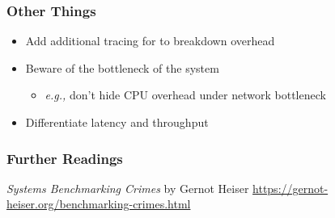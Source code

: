 \documentclass[xcolor={dvipsnames},aspectratio=149]{beamer}
\def\eg{\emph{e.g.,}\xspace}
\begin{document}
\begin{frame}
  \frametitle{Other Things}
  \begin{itemize}
  \item Add additional tracing for to breakdown overhead
  \item Beware of the bottleneck of the system
    \begin{itemize}
    \item \eg don't hide CPU overhead under network bottleneck
    \end{itemize}
  \item Differentiate latency and throughput
  \end{itemize}
\end{frame}

\begin{frame}
  \frametitle{Further Readings}
    \textit{Systems Benchmarking Crimes} by Gernot Heiser \url{https://gernot-heiser.org/benchmarking-crimes.html}
\end{frame}
\end{document}
